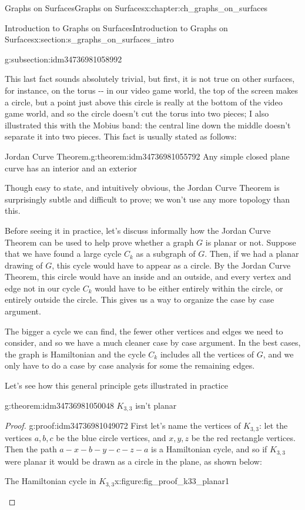 \documentclass[oneside,10pt,]{book}
\numberwithin{equation}{section}
\begin{document}
\begin{chapterptx}{Graphs on Surfaces}{}{Graphs on Surfaces}{}{}{x:chapter:ch_graphs_on_surfaces}
\begin{sectionptx}{Introduction to Graphs on Surfaces}{}{Introduction to Graphs on Surfaces}{}{}{x:section:s_graphs_on_surfaces_intro}
\begin{subsectionptx}{}{}{}{}{}{g:subsection:idm34736981058992}
\par
This last fact sounds absolutely trivial, but first, it is not true on other surfaces, for instance, on the torus -{}-{} in our video game world, the top of the screen makes a circle, but a point just above this circle is really at the bottom of the video game world, and so the circle doesn't cut the torus into two pieces; I also illustrated this with the Mobius band: the central line down the middle doesn't separate it into two pieces.  This fact is usually stated as follows:%
\begin{theorem}{Jordan Curve Theorem.}{}{g:theorem:idm34736981055792}%
Any simple closed plane curve has an interior and an exterior%
\end{theorem}
Though easy to state, and intuitively obvious, the Jordan Curve Theorem is surprisingly subtle and difficult to prove; we won't use any more topology than this.%
\par
Before seeing it in practice, let's discuss informally how the Jordan Curve Theorem can be used to help prove whether a graph \(G\) is planar or not.  Suppose that we have found a large cycle \(C_k\) as a subgraph of \(G\).  Then, if we had a planar drawing of \(G\), this cycle would have to appear as a circle.  By the Jordan Curve Theorem, this circle would have an inside and an outside, and every vertex and edge not in our cycle \(C_k\) would have to be either entirely within the circle, or entirely outside the circle.  This gives us a way to organize the case by case argument.%
\par
The bigger a cycle we can find, the fewer other vertices and edges we need to consider, and so we have a much cleaner case by case argument.  In the best cases, the graph is Hamiltonian and the cycle \(C_k\) includes all the vertices of \(G\), and we only have to do a case by case analysis for some the remaining edges.%
\par
Let's see how this general principle gets illustrated in practice%
\begin{theorem}{}{}{g:theorem:idm34736981050048}%
\(K_{3,3}\) isn't planar\end{theorem}
\begin{proof}{}{g:proof:idm34736981049072}
First let's name the vertices of \(K_{3,3}\): let the vertices \(a,b,c\) be the blue circle vertices, and \(x,y,z\) be the red rectangle vertices.  Then the path \(a-x-b-y-c-z-a\) is a Hamiltonian cycle, and so if \(K_{3,3}\) were planar it would be drawn as a circle in the plane, as shown below:%
\begin{figureptx}{The Hamiltonian cycle in \(K_{3,3}\)}{x:figure:fig_proof_k33_planar1}{}%

\end{figureptx}
\end{proof}
\end{subsectionptx}
\end{sectionptx}
\end{chapterptx}
\end{document}
